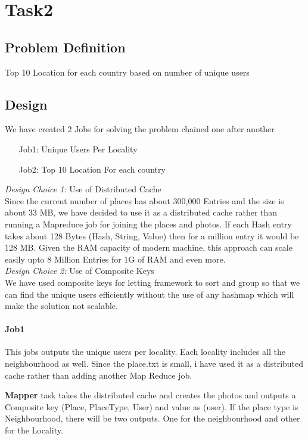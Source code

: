 \chapter{Task2}

\section{Problem Definition}
	Top 10 Location for each country based on number of unique users 
	
\section{Design}
	We have created 2 Jobs for solving the problem chained one after another\\
	\begin{itemize}
		\item [Job1:] Unique Users Per Locality  
		\item [Job2:] Top 10 Location For each country
	\end{itemize}

	
	\emph{Design Choice 1:}  Use of Distributed Cache \\
		Since the current number of places has about 300,000 Entries and the size is about 33 MB, we have decided to use it as a distributed cache rather than running a Mapreduce job for joining the places and photos. If each Hash entry takes about 128 Bytes (Hash, String, Value) then for a million entry it would be 128 MB. Given the RAM capacity of modern machine, this approach can scale easily upto 8 Million Entries for 1G of RAM and even more. \\
	\emph{Design Choice 2:} Use of Composite Keys \\
		We have used composite keys for letting framework to sort and group so that we can find the unique users efficiently without the use of any hashmap which will make the solution not scalable. 
		
\subsubsection{Job1}
	This jobs outputs the unique users per locality. Each locality includes all the neighbourhood as well. Since the place.txt is small, i have used it as a distributed cache rather than adding another Map Reduce job.
	
	\textbf{Mapper} task takes the distributed cache and creates the photos and outputs a Composite key (Place, PlaceType, User) and value as (user). If the place type is Neighbourhood, there will be two outputs. One for the neighbourhood and other for the Locality. 
	
